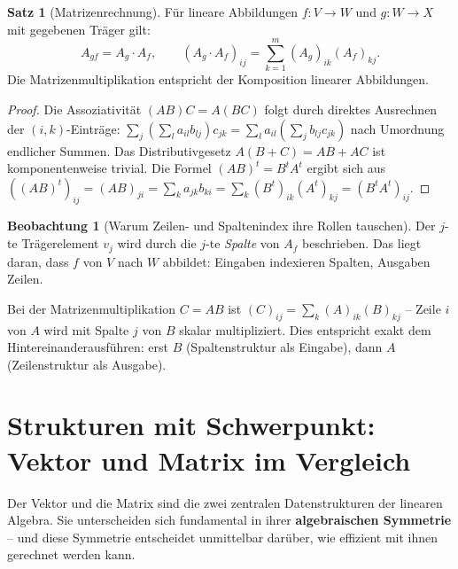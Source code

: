 ﻿\documentclass[a4paper,12pt]{report}
\theoremstyle{definition}
\newtheorem{satz}{Satz}
\newtheorem{beobachtung}{Beobachtung}
\begin{document}
\begin{satz}[Matrizenrechnung]
    Für lineare Abbildungen $f : V \to W$ und $g : W \to X$ mit gegebenen
    Träger gilt:
    \[
        A_{gf} = A_g \cdot A_f, \qquad (A_g \cdot A_f)_{ij}
        = \sum_{k=1}^{m} (A_g)_{ik} (A_f)_{kj}.
    \]
    Die Matrizenmultiplikation entspricht der Komposition linearer Abbildungen.
\end{satz}
\begin{proof}
    Die Assoziativität $(AB)C = A(BC)$ folgt durch direktes Ausrechnen der
    $(i,k)$-Einträge: $\sum_j (\sum_l a_{il} b_{lj}) c_{jk} = \sum_l a_{il}
    (\sum_j b_{lj} c_{jk})$ nach Umordnung endlicher Summen.
    Das Distributivgesetz $A(B+C) = AB + AC$ ist komponentenweise trivial.
    Die Formel $(AB)^t = B^t A^t$ ergibt sich aus $((AB)^t)_{ij} = (AB)_{ji}
    = \sum_k a_{jk} b_{ki} = \sum_k (B^t)_{ik} (A^t)_{kj} = (B^t A^t)_{ij}$.
\end{proof}


\begin{beobachtung}[Warum Zeilen- und Spaltenindex ihre Rollen tauschen]
    Der $j$-te Trägerelement $v_j$ wird durch die $j$-te \emph{Spalte} von $A_f$
    beschrieben. Das liegt daran, dass $f$ von $V$ nach $W$ abbildet:
    Eingaben indexieren Spalten, Ausgaben Zeilen.

    Bei der Matrizenmultiplikation $C = AB$ ist $(C)_{ij} = \sum_k (A)_{ik}(B)_{kj}$
    -- Zeile $i$ von $A$ wird mit Spalte $j$ von $B$ skalar multipliziert.
    Dies entspricht exakt dem Hintereinanderausführen: erst $B$ (Spaltenstruktur
    als Eingabe), dann $A$ (Zeilenstruktur als Ausgabe).
\end{beobachtung}

\section{Strukturen mit Schwerpunkt: Vektor und Matrix im Vergleich}

Der Vektor und die Matrix sind die zwei zentralen Datenstrukturen der
linearen Algebra. Sie unterscheiden sich fundamental in ihrer
\textbf{algebraischen Symmetrie} -- und diese Symmetrie entscheidet
unmittelbar darüber, wie effizient mit ihnen gerechnet werden kann.
\end{document}
